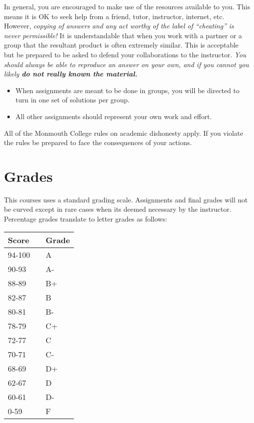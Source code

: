 \documentclass[10pt]{article}
\begin{document}
In general, you are encouraged to make use of the resources available to you.  This means it is OK to seek help from a friend, tutor, instructor, internet, etc.  However, \textit{copying of answers and any act worthy of the label of ``cheating'' is never permissible!}  It is understandable that when you work with a partner or a group that the resultant product is often extremely similar.  This is acceptable but be prepared to be asked to defend your collaborations to the instructor.  \textit{You should always be able to reproduce an answer on your own, and if you cannot you likely \textbf{do not really known the material.}} 
\begin{itemize}
\item When assignments are meant to be done in groups, you will be directed to turn in one set of solutions per group.
\item All other assignments should represent your own work and effort.
\end{itemize}
All of the Monmouth College rules on academic dishonesty apply.  If you violate the rules be prepared to face the consequences of your actions. 


\newpage
\section{Grades}

This courses uses a standard grading scale.  Assignments and final grades will not be curved except in rare cases when its deemed necessary by the instructor.  Percentage grades translate to letter grades as follows:

\begin{center}
\begin{small}
\begin{tabular}{lcl}
Score & & Grade \\ \hline
94-100 & & A \\
90-93 & & A- \\
88-89 & & B+ \\
82-87 & & B \\
80-81 & & B- \\
78-79 & & C+ \\
72-77 & & C \\
70-71 & & C- \\
68-69 & & D+ \\
62-67 & & D \\
60-61 & & D- \\
0-59 & & F 
\end{tabular}
\end{small}
\end{center}
\end{document}
